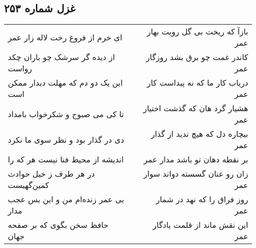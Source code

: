 \begin{center}
\section*{غزل شماره ۲۵۳}
\label{sec:sh253}
\begin{longtable}{l p{0.5cm} r}
ای خرم از فروغ رخت لاله زار عمر
&&
بازآ که ریخت بی گل رویت بهار عمر
\\
از دیده گر سرشک چو باران چکد رواست
&&
کاندر غمت چو برق بشد روزگار عمر
\\
این یک دو دم که مهلت دیدار ممکن است
&&
دریاب کار ما که نه پیداست کار عمر
\\
تا کی می صبوح و شکرخواب بامداد
&&
هشیار گرد هان که گذشت اختیار عمر
\\
دی در گذار بود و نظر سوی ما نکرد
&&
بیچاره دل که هیچ ندید از گذار عمر
\\
اندیشه از محیط فنا نیست هر که را
&&
بر نقطه دهان تو باشد مدار عمر
\\
در هر طرف ز خیل حوادث کمین‌گهیست
&&
زان رو عنان گسسته دواند سوار عمر
\\
بی عمر زنده‌ام من و این بس عجب مدار
&&
روز فراق را که نهد در شمار عمر
\\
حافظ سخن بگوی که بر صفحه جهان
&&
این نقش ماند از قلمت یادگار عمر
\\
\end{longtable}
\end{center}
